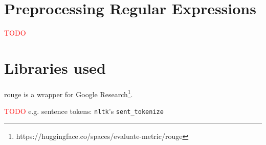 \section{Preprocessing Regular Expressions}
\label{app:regex_preproc}

\textcolor{red}{TODO}









\section{Libraries used}
\label{app:libraries}

\ac{rouge} is a wrapper for Google Research\footnote{https://huggingface.co/spaces/evaluate-metric/rouge}.


\textcolor{red}{TODO}
e.g. sentence tokens: \texttt{nltk}'s \texttt{sent\_tokenize}